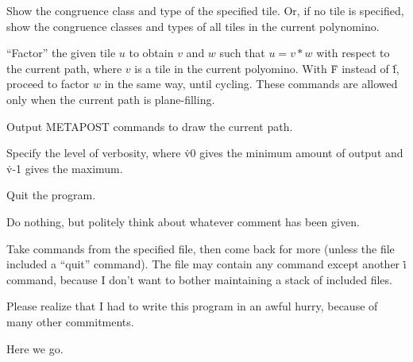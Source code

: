 Show the congruence class and type of the specified tile.
Or, if no tile is specified, show the congruence classes and types
of all tiles in the current polynomino.

``Factor'' the given tile $u$ to obtain $v$ and $w$ such that $u=v*w$
with respect to the current path, where $v$ is a tile in the current
polyomino. With \.F instead of \.f, proceed to factor $w$ in the same
way, until cycling. These commands are allowed only when the current path is
plane-filling.

Output {\logo METAPOST} commands to draw the current path.

Specify the level of verbosity,
where \.{v0} gives the minimum amount of output
and \.{v-1} gives the maximum.

Quit the program.

Do nothing, but politely think about whatever comment has been given.

Take commands from the specified file, then come back for more
(unless the file included a ``quit'' command). The file may
contain any command except another \.i command, because I don't
want to bother maintaining a stack of included files.

\smallskip\noindent
Please realize that I had to write this program in an awful hurry,
because of many other commitments.

\fi

Here we go.

